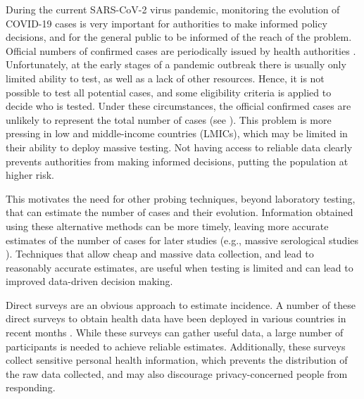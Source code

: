 \documentclass[sigconf]{acmart}
\begin{document}
During the current SARS-CoV-2 virus pandemic, monitoring the evolution of COVID-19 cases is very important for authorities to make
informed policy decisions, and for the general public to be informed of the reach of the problem. 
Official numbers of confirmed cases are periodically issued by health authorities \cite{ECDC}. 
Unfortunately, at the early stages of a pandemic outbreak  there is usually only limited ability to test, as well as a lack of other resources. Hence, it is not possible to test all potential cases, and some eligibility criteria is applied to decide who is tested.
Under these circumstances, the official confirmed cases are unlikely to represent the total number of cases (see \cite{maxmen2020much}).
This problem is more pressing in low and middle-income countries (LMICs), which may be limited in their ability to deploy massive testing.
Not having access to reliable data clearly prevents authorities from making informed decisions, putting the population at higher risk.

This motivates the need for other probing techniques, beyond laboratory testing, that can estimate  the number of cases and their evolution. Information obtained using these alternative methods can be more timely, leaving more accurate estimates of the number of cases for later studies  (e.g.,  massive serological studies \cite{yang2012serological}).  Techniques that allow cheap and massive data collection, and lead to reasonably accurate estimates, 
are useful when testing is limited and can lead to improved data-driven decision making. 

Direct surveys are an obvious approach to estimate incidence. A number of these direct surveys to obtain health data have been deployed in various countries in recent months \cite{linares1920estimando,DBLP:journals/corr/abs-2004-01014,FB-survey}. While these surveys can gather  useful data, a large number of participants is needed to achieve reliable estimates. Additionally, these surveys collect sensitive personal health information, which prevents the distribution of the raw data collected, and may also discourage privacy-concerned people from responding.
\end{document}
